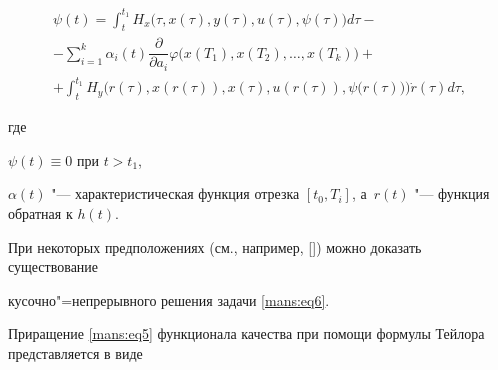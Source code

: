 \begin{multline}

\psi (t)= \int_{t}^{t_{1}} H_{x} \bigl(\tau, x(\tau), y(\tau), u(\tau), \psi (\tau)\bigr) d\tau - 

\\

-

\sum_{i=1}^{k} \alpha_{i} (t) \dfrac{\partial } {\partial a_{i}} \varphi \bigl(x(T_{1}), x(T_{2}), \ldots, x(T_{k})\bigr) + \\

+\int_{t}^{t_{1}} H_{y} \bigl(r(\tau), x(r(\tau)), x(\tau), u(r(\tau)), \psi \bigl(r(\tau)\bigr) \bigr) \dot{r}(\tau) d\tau ,

\label{mans:eq6}

\end{multline}

где 

$\psi (t)\equiv 0$ при $t>t_{1}$,

$ \alpha (t) $  "--- характеристическая функция отрезка  $ [ t_{0}, T_{i} ] $, а~$ r(t) $ "--- функция обратная к  $ h(t) $.



При некоторых предположениях (см., например, []) можно доказать существование 

кусочно"=непрерывного решения задачи \eqref{mans:eq6}.



Приращение \eqref{mans:eq5} функционала качества при помощи формулы Тейлора представляется в виде


